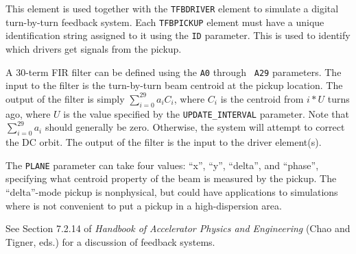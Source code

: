 This element is used together with the {\tt TFBDRIVER} element to
simulate a digital turn-by-turn feedback system.  Each {\tt TFBPICKUP}
element must have a unique identification string assigned to it using
the {\tt ID} parameter.  This is used to identify which drivers get
signals from the pickup.

A 30-term FIR filter can be defined using the {\tt A0} through {\tt
A29} parameters.  The input to the filter is the turn-by-turn beam
centroid at the pickup location.  The output of the filter is simply
$\sum_{i=0}^{29} a_i C_i$, where $C_i$ is the centroid from $i*U$ turns
ago, where $U$ is the value specified by the \verb|UPDATE_INTERVAL| parameter.
Note that $\sum_{i=0}^{29} a_i$ should generally be zero. Otherwise, the
system will attempt to correct the DC orbit.  The output of the filter
is the input to the driver element(s).

The \verb|PLANE| parameter can take four values: ``x'', ``y'', ``delta'', and ``phase'', specifying
what centroid property of the beam is measured by the pickup. The ``delta''-mode pickup
is nonphysical, but could have applications to simulations where is not convenient to put a 
pickup in a high-dispersion area.

See Section 7.2.14 of {\em Handbook of Accelerator Physics and Engineering}
(Chao and Tigner, eds.) for a discussion of feedback systems.
